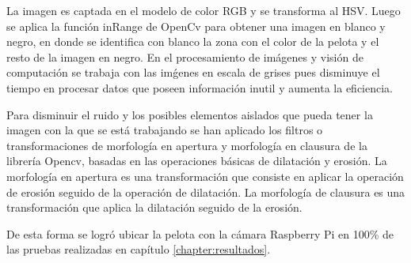 La imagen es captada en el modelo de color \gls{RGB} y se transforma al \gls{HSV}. Luego se aplica la función inRange de OpenCv para obtener una imagen en blanco y negro, en donde se identifica con blanco la zona con el color de la pelota y el resto de la imagen en negro. En el procesamiento de im\'agenes y visi\'on de computaci\'on se trabaja con las im\'genes en escala de grises pues disminuye el tiempo en procesar datos que poseen informaci\'on inutil y aumenta la eficiencia.

Para disminuir el ruido y los posibles elementos aislados que pueda tener la imagen con la que se está trabajando se han aplicado los filtros o transformaciones de morfología en apertura y morfología en clausura de la librería Opencv, basadas en las operaciones básicas de dilatación y erosión. La morfología en apertura es una transformación que consiste en aplicar la operación de erosión seguido de la operación de dilatación. La morfología de clausura es una transformación que aplica la dilatación seguido de la erosión.

De esta forma se logró ubicar la pelota con la cámara Raspberry Pi en 100\% de las pruebas realizadas en cap\'itulo \ref{chapter:resultados}.


